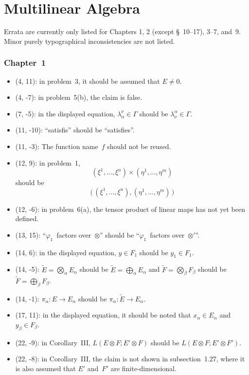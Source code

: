 \documentclass[letterpaper,12pt]{article}
\newcommand{\bigdsum}{\bigoplus}
\newcommand{\tprod}{\otimes}
\newcommand{\bigtprod}{\bigotimes}
\begin{document}
\newpage
\part*{Multilinear Algebra}
Errata are currently only listed for Chapters 1, 2 (except \S~10--17), 3--7, and~9. Minor purely typographical inconsistencies are not listed.

\section*{Chapter~1}
\begin{itemize}
\item (4, 11): in problem~3, it should be assumed that \(E\ne 0\).
\item (4, -7): in problem~5(b), the claim is false.
\item (7, -5): in the displayed equation, \(\lambda^{\nu}_{\alpha}\in\Gamma\) should be \(\lambda^{\alpha}_{\nu}\in\Gamma\).
\item (11, -10): ``satisfis'' should be ``satisfies''.
\item (11, -3): The function name~\(f\) should not be reused.
\item (12, 9): in problem~1,
\[(\xi^1,\ldots,\xi^n)\times(\eta^1,\ldots,\eta^m)\]
should be
\[\bigl(\,(\xi^1,\ldots,\xi^n),(\eta^1,\ldots,\eta^m)\,\bigr)\]
\item (12, -6): in problem~6(a), the tensor product of linear maps has not yet been defined.
\item (13, 15): ``\(\varphi_1\)~factors over~\(\tprod\)'' should be ``\(\varphi_1\)~factors over~\(\tprod'\)''.
\item (14, 6): in the displayed equation, \(y\in F_1\) should be \(y_1\in F_1\).
\item (14, -5): \(\widetilde{E}=\bigtprod_{\alpha}E_{\alpha}\) should be \(\widetilde{E}=\bigdsum_{\alpha}E_{\alpha}\) and \(\widetilde{F}=\bigtprod_{\beta}F_{\beta}\) should be \(\widetilde{F}=\bigdsum_{\beta}F_{\beta}\).
\item (14, -1): \(\pi_{\alpha}:E\to E_{\alpha}\) should be \(\pi_{\alpha}:\widetilde{E}\to E_{\alpha}\).
\item (17, 11): in the displayed equation, it should be noted that \(x_{\alpha}\in E_{\alpha}\) and \(y_{\beta}\in F_{\beta}\).
\item (22, -9): in Corollary~III, \(L(E\tprod F;E'\tprod F)\) should be \(L(E\tprod F;E'\tprod F')\).
\item (22, -8): in Corollary~III, the claim is not shown in subsection~1.27, where it is also assumed that \(E'\) and~\(F'\) are finite-dimensional.

\end{itemize}
\end{document}
